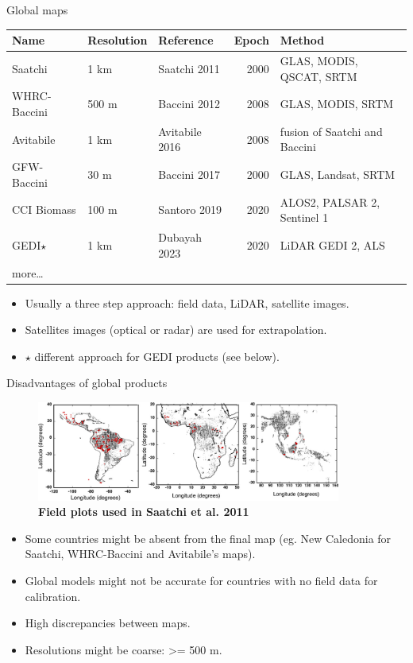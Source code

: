 \documentclass[10pt,table,dvipsnames,compress]{beamer}
\begin{document}
\begin{frame}[label={sec:org352a738}]{Global maps}
\begin{center}
\footnotesize
\begin{tabular}{lllrl}
Name & Resolution & Reference & Epoch & Method\\[0pt]
\hline
Saatchi & 1 km & Saatchi 2011 & 2000 & GLAS, MODIS, QSCAT, SRTM\\[0pt]
WHRC-Baccini & 500 m & Baccini 2012 & 2008 & GLAS, MODIS, SRTM\\[0pt]
Avitabile & 1 km & Avitabile 2016 & 2008 & fusion of Saatchi and Baccini\\[0pt]
GFW-Baccini & 30 m & Baccini 2017 & 2000 & GLAS, Landsat, SRTM\\[0pt]
CCI Biomass & 100 m & Santoro 2019 & 2020 & ALOS2, PALSAR 2, Sentinel 1\\[0pt]
GEDI\(\star\) & 1 km & Dubayah 2023 & 2020 & LiDAR GEDI 2, ALS\\[0pt]
more\ldots{} &  &  &  & \\[0pt]
\end{tabular}
\end{center}

\begin{itemize}
\item Usually a three step approach: field data, LiDAR, satellite images.
\item Satellites images (optical or radar) are used for extrapolation.
\item \(\star\) different approach for GEDI products (see below).
\end{itemize}
\end{frame}

\begin{frame}[label={sec:orgb75372b}]{Disadvantages of global products}
\begin{figure}[htbp]
\centering
\includegraphics[width=10cm]{figs/carbon/data-saatchi.png}
\caption{\textbf{Field plots used in Saatchi et al. 2011}}
\end{figure}

\begin{itemize}
\item Some countries might be absent from the final map (eg. New Caledonia for Saatchi, WHRC-Baccini and Avitabile's maps).
\item Global models might not be accurate for countries with no field data for calibration.
\item High discrepancies between maps.
\item Resolutions might be coarse: >= 500 m.
\end{itemize}
\end{frame}
\end{document}
